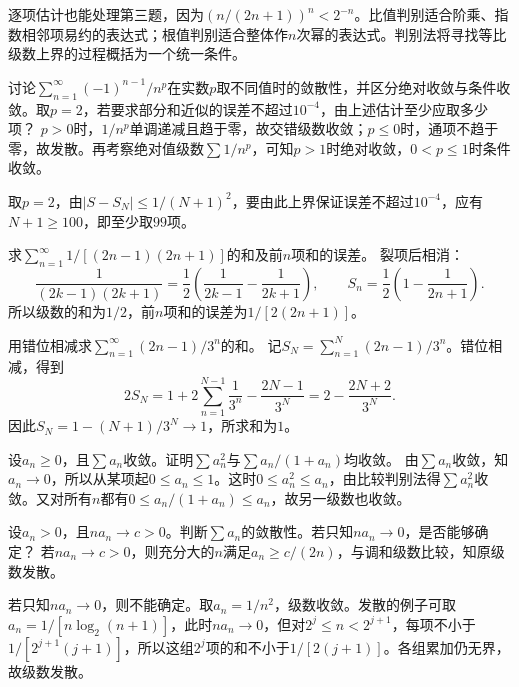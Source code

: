 逐项估计也能处理第三题，因为\((n/(2n+1))^n<2^{-n}\)。比值判别适合阶乘、指数相邻项易约的表达式；根值判别适合整体作\(n\)次幂的表达式。判别法将寻找等比级数上界的过程概括为一个统一条件。


讨论\(\sum_{n=1}^{\infty}(-1)^{n-1}/n^p\)在实数\(p\)取不同值时的敛散性，并区分绝对收敛与条件收敛。取\(p=2\)，若要求部分和近似的误差不超过\(10^{-4}\)，由上述估计至少应取多少项？
\solutionanswer
\(p>0\)时，\(1/n^p\)单调递减且趋于零，故交错级数收敛；\(p\le0\)时，通项不趋于零，故发散。再考察绝对值级数\(\sum1/n^p\)，可知\(p>1\)时绝对收敛，\(0<p\le1\)时条件收敛。

取\(p=2\)，由\(|S-S_N|\le1/(N+1)^2\)，要由此上界保证误差不超过\(10^{-4}\)，应有\(N+1\ge100\)，即至少取\(99\)项。


求\(\sum_{n=1}^{\infty}1/[(2n-1)(2n+1)]\)的和及前\(n\)项和的误差。
\solutionanswer
裂项后相消：
\[
\frac1{(2k-1)(2k+1)}=\frac12\left(\frac1{2k-1}-\frac1{2k+1}\right),
\qquad
S_n=\frac12\left(1-\frac1{2n+1}\right).
\]
所以级数的和为\(1/2\)，前\(n\)项和的误差为\(1/[2(2n+1)]\)。


用错位相减求\(\sum_{n=1}^{\infty}(2n-1)/3^n\)的和。
\solutionanswer
记\(S_N=\sum_{n=1}^N(2n-1)/3^n\)。错位相减，得到
\[
2S_N=1+2\sum_{n=1}^{N-1}\frac1{3^n}-\frac{2N-1}{3^N}
=2-\frac{2N+2}{3^N}.
\]
因此\(S_N=1-(N+1)/3^N\to1\)，所求和为\(1\)。


设\(a_n\ge0\)，且\(\sum a_n\)收敛。证明\(\sum a_n^2\)与\(\sum a_n/(1+a_n)\)均收敛。
\solutionanswer
由\(\sum a_n\)收敛，知\(a_n\to0\)，所以从某项起\(0\le a_n\le1\)。这时\(0\le a_n^2\le a_n\)，由比较判别法得\(\sum a_n^2\)收敛。又对所有\(n\)都有\(0\le a_n/(1+a_n)\le a_n\)，故另一级数也收敛。


设\(a_n>0\)，且\(na_n\to c>0\)。判断\(\sum a_n\)的敛散性。若只知\(na_n\to0\)，是否能够确定？
\solutionanswer
若\(na_n\to c>0\)，则充分大的\(n\)满足\(a_n\ge c/(2n)\)，与调和级数比较，知原级数发散。

若只知\(na_n\to0\)，则不能确定。取\(a_n=1/n^2\)，级数收敛。发散的例子可取\(a_n=1/[n\log_2(n+1)]\)，此时\(na_n\to0\)，但对\(2^j\le n<2^{j+1}\)，每项不小于\(1/[2^{j+1}(j+1)]\)，所以这组\(2^j\)项的和不小于\(1/[2(j+1)]\)。各组累加仍无界，故级数发散。


